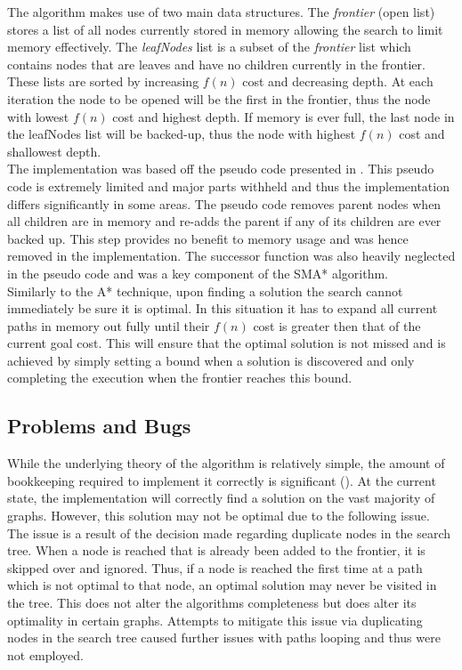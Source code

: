 \documentclass[]{article}
\begin{document}
The algorithm makes use of two main data structures. The \textit{frontier} (open list) stores a list of all nodes currently stored in memory allowing the search to limit memory effectively. The \textit{leafNodes} list is a subset of the \textit{frontier} list which contains nodes that are leaves and have no children currently in the frontier. These lists are sorted by increasing $f(n)$ cost and decreasing depth. At each iteration the node to be opened will be the first in the frontier, thus the node with lowest $f(n)$ cost and highest depth. If memory is ever full, the last node in the leafNodes list will be backed-up, thus the node with highest $f(n)$ cost and shallowest depth.\\

The implementation was based off the pseudo code presented in \cite{russell_paper}. This pseudo code is extremely limited and major parts withheld and thus the implementation differs significantly in some areas. The pseudo code removes parent nodes when all children are in memory and re-adds the parent if any of its children are ever backed up. This step provides no benefit to memory usage and was hence removed in the implementation. The successor function was also heavily neglected in the pseudo code and was a key component of the SMA* algorithm.\\

Similarly to the A* technique, upon finding a solution the search cannot immediately be sure it is optimal. In this situation it has to expand all current paths in memory out fully until their $f(n)$ cost is greater then that of the current goal cost. This will ensure that the optimal solution is not missed and is achieved by simply setting a bound when a solution is discovered and only completing the execution when the frontier reaches this bound.

\subsection*{Problems and Bugs}

While the underlying theory of the algorithm is relatively simple, the amount of bookkeeping required to implement it correctly is significant (\cite{norvig}). At the current state, the implementation will correctly find a solution on the vast majority of graphs. However, this solution may not be optimal due to the following issue. \\

The issue is a result of the decision made regarding duplicate nodes in the search tree. When a node is reached that is already been added to the frontier, it is skipped over and ignored. Thus, if a node is reached the first time at a path which is not optimal to that node, an optimal solution may never be visited in the tree. This does not alter the algorithms completeness but does alter its optimality in certain graphs. Attempts to mitigate this issue via duplicating nodes in the search tree caused further issues with paths looping and thus were not employed.\\
\end{document}
